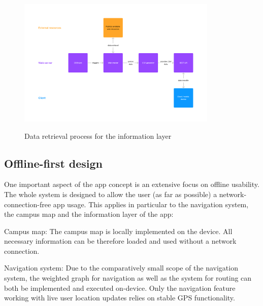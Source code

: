 \begin{figure}[H]
	\centering
	\includegraphics[width=0.85\textwidth]{images/information_layer_backend.png}\\
	\caption{Data retrieval process for the information layer}
\end{figure}


\subsection{Offline-first design}
One important aspect of the app concept is an extensive focus on offline usability. The whole system is designed to allow the user (as far as possible) a network-connection-free app usage. This applies in particular to the navigation system, the campus map and the information layer of the app:

Campus map: The campus map is locally implemented on the device. All necessary information can be therefore loaded and used without a network connection.

Navigation system: Due to the comparatively small scope of the navigation system, the weighted graph for navigation as well as the system for routing can both be implemented and executed on-device. Only the navigation feature working with live user location updates relies on stable GPS functionality.

